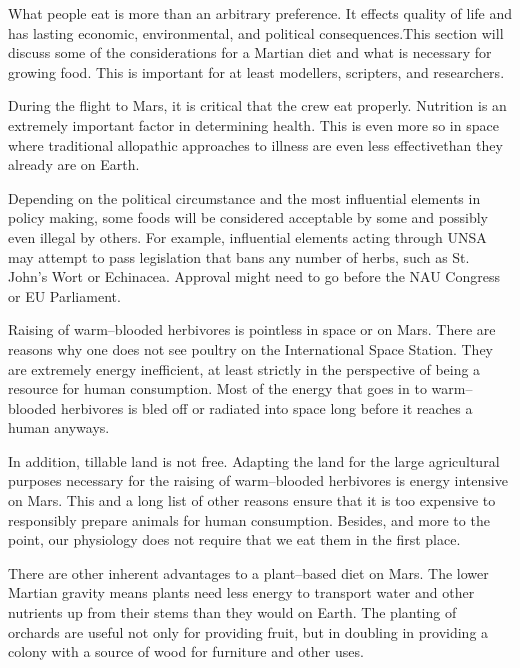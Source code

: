 

What people eat is more than an arbitrary preference. It effects quality of life and has lasting economic, environmental, and political consequences. This section will discuss some of the considerations for a Martian diet and what is necessary for growing food. This is important for at least modellers, scripters, and researchers.

During the flight to Mars, it is critical that the crew eat properly. Nutrition is an extremely important factor in determining health. This is even more so in space where traditional allopathic approaches to illness are even less effective than they already are on Earth.

Depending on the political circumstance and the most influential elements in policy making, some foods will be considered acceptable by some and possibly even illegal by others. For example, influential elements acting through UNSA may attempt to pass legislation that bans any number of herbs, such as St. John’s Wort or Echinacea. Approval might need to go before the NAU Congress or EU Parliament.

Raising of warm--blooded herbivores is pointless in space or on Mars. There are reasons why one does not see poultry on the International Space Station. They are extremely energy inefficient, at least strictly in the perspective of being a resource for human consumption. Most of the energy that goes in to warm--blooded herbivores is bled off or radiated into space long before it reaches a human anyways. 

In addition, tillable land is not free. Adapting the land for the large agricultural purposes necessary for the raising of warm--blooded herbivores is energy intensive on Mars. This and a long list of other reasons ensure that it is too expensive to responsibly prepare animals for human consumption. Besides, and more to the point, our physiology does not require that we eat them in the first place.

There are other inherent advantages to a plant--based diet on Mars. The lower Martian gravity means plants need less energy to transport water and other nutrients up from their stems than they would on Earth. The planting of orchards are useful not only for providing fruit, but in doubling in providing a colony with a source of wood for furniture and other uses.

